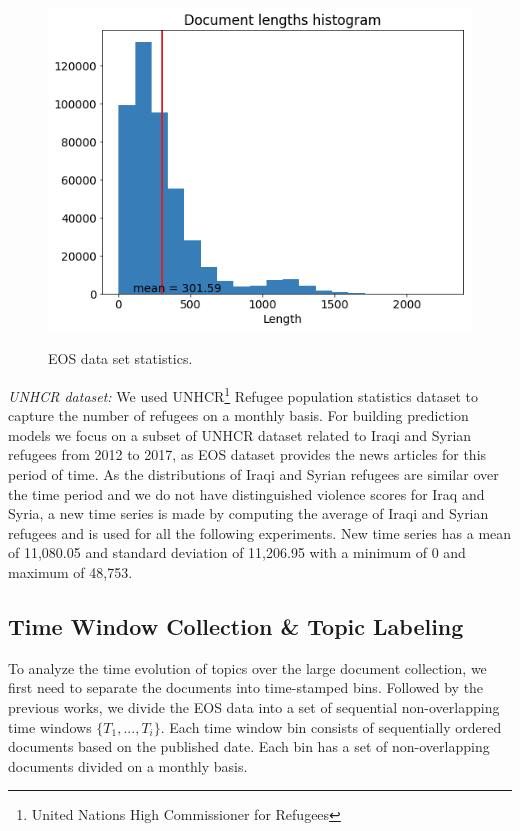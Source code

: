\begin{figure}[t]
\caption{EOS data set statistics.}
\includegraphics[scale=.35]{img/corpus_histogram.png}
\centering
\label{fig:corpus_histogram}
\end{figure}

\textit{UNHCR dataset:}
We used UNHCR\footnote{United Nations High Commissioner for Refugees} Refugee population statistics dataset to capture the number of refugees on a monthly basis. For building prediction models we focus on a subset of UNHCR dataset related to Iraqi and Syrian refugees from 2012 to 2017, as EOS dataset provides the news articles for this period of time. As the distributions of Iraqi and Syrian refugees are similar over the time period and we do not have distinguished violence scores for Iraq and Syria, a new time series is made by computing the average of Iraqi and Syrian refugees and is used for all the following experiments. New time series has a mean of 11,080.05 and standard deviation of 11,206.95 with a minimum of 0 and maximum of 48,753.


\subsection{Time Window Collection \& Topic Labeling} \label{topicLabeling}
To analyze the time evolution of topics over the large document collection, we first need to separate the documents into time-stamped bins. Followed by the previous works\cite{Sulo2010}, we divide the EOS data into a set of sequential non-overlapping time windows $\{T_1, ... , T_i\}$. Each time window bin consists of sequentially ordered documents based on the published date. Each bin has a set of non-overlapping documents divided on a monthly basis.

